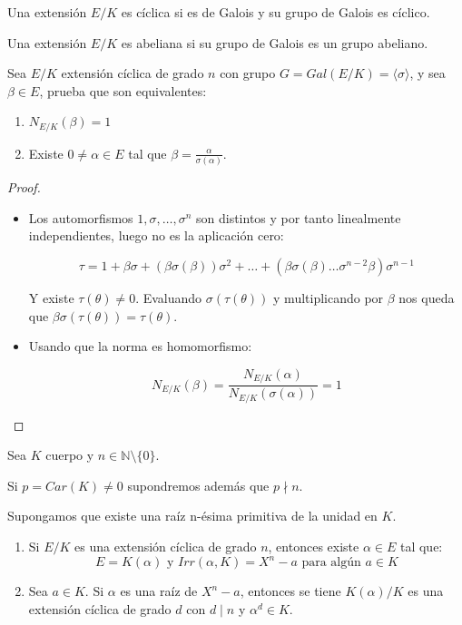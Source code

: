 \begin{definition}
Una extensión $E/K$ es cíclica si es de Galois y su grupo de Galois es cíclico.

Una extensión $E/K$ es abeliana si su grupo de Galois es un grupo abeliano.  
\end{definition}

\begin{theorem}
Sea $E/K$ extensión cíclica de grado $n$ con grupo $G = Gal(E/K) = \langle \sigma\rangle$, y
sea $\beta \in E$, prueba que son equivalentes:

\begin{enumerate}
\item $N_{E/K}(\beta) = 1$
\item Existe $0 \neq \alpha \in E$ tal que $\beta = \frac{\alpha}{\sigma(\alpha)}$.
\end{enumerate}
\end{theorem}
\begin{proof}
\begin{itemize}
\item 
Los automorfismos $1,\sigma,\dots,\sigma^n$ son distintos y por tanto linealmente
independientes, luego no es la aplicación cero:

\[
\tau 
= 
1 + \beta\sigma + (\beta \sigma(\beta))\sigma^2 + 
\dots +
(\beta \sigma(\beta)\dots \sigma^{n-2}\beta) \sigma^{n-1}
\]

Y existe $\tau(\theta) \neq 0$. Evaluando $\sigma(\tau(\theta))$ y multiplicando por $\beta$ nos queda
que $\beta \sigma(\tau(\theta)) = \tau(\theta)$.

\item 
Usando que la norma es homomorfismo:

\[
N_{E/K}(\beta) = \frac{N_{E/K}(\alpha)}{N_{E/K}(\sigma(\alpha))} = 1
\]
\end{itemize}
\end{proof}

\begin{theorem}
Sea $K$ cuerpo y $n \in \mathbb{N} \setminus \{0\}$. 

Si $p = Car(K) \neq 0$ supondremos además que $p \nmid n$. 

Supongamos que existe una raíz n-ésima primitiva de la unidad en $K$.

\begin{enumerate}
\item Si $E/K$ es una extensión cíclica de grado $n$, entonces existe $\alpha \in E$ tal que: $$E = K(\alpha) \text{ y } Irr(\alpha,K) = X^n-a \text{ para algún } a \in K$$
\item Sea $a \in K$. Si $\alpha$ es una raíz de $X^n-a$, entonces se tiene $K(\alpha)/K$ es una extensión cíclica de grado $d$ con $d \mid n$ y $\alpha^d \in K$.
\end{enumerate}
\end{theorem}

